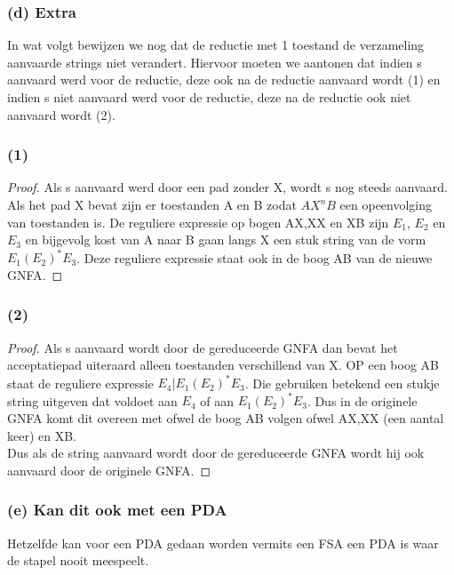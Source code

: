\subsubsection*{(d) Extra}
In wat volgt bewijzen we nog dat de reductie met 1 toestand de verzameling aanvaarde strings niet verandert. Hiervoor moeten we aantonen dat indien s aanvaard werd voor de reductie, deze ook na de reductie aanvaard wordt (1) en indien s niet aanvaard werd voor de reductie, deze na de reductie ook niet aanvaard wordt (2).\\
\subsubsection*{(1)}
\begin{proof}
Als s aanvaard werd door een pad zonder X, wordt s nog steeds aanvaard. Als het pad X bevat zijn er toestanden A en B zodat $AX^n B$ een opeenvolging van toestanden is. De reguliere expressie op bogen AX,XX en XB zijn $E_1$, $E_2$ en $E_3$ en bijgevolg kost van A naar B gaan langs X een stuk string van de vorm $E_1  (E_2)^* E_3$. Deze reguliere expressie staat ook in de boog AB van de nieuwe GNFA.
\end{proof}
\subsubsection*{(2)}
\begin{proof}
Als s aanvaard wordt door de gereduceerde GNFA dan bevat het acceptatiepad uiteraard alleen toestanden verschillend van X. OP een boog AB staat de reguliere expressie $E_4 | E_1 (E_2)^* E_3$. Die gebruiken betekend een stukje string uitgeven dat voldoet aan $E_4$ of aan $E_1 (E_2)^* E_3$. Dus in de originele GNFA komt dit overeen met ofwel de boog AB volgen ofwel AX,XX (een aantal keer) en XB.\\
Dus als de string aanvaard wordt door de gereduceerde GNFA wordt hij ook aanvaard door de originele GNFA.
\end{proof}

\subsubsection*{(e) Kan dit ook met een PDA}
Hetzelfde kan voor een PDA gedaan worden vermits een FSA een PDA is waar de stapel nooit meespeelt. 
